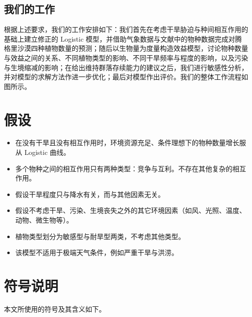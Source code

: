 \documentclass[11pt,a4paper]{ctexart}
\begin{document}
\subsection{我们的工作}

根据上述要求，我们的工作安排如下：我们首先在考虑干旱胁迫与种间相互作用的基础上建立修正的 Logistic 模型，并借助气象数据与文献中的物种数据完成对腾格里沙漠四种植物数量的预测；随后以生物量为度量构造效益模型，讨论物种数量与效益之间的关系、不同植物类型的影响、不同干旱频率与程度的影响，以及污染与生境缩减的影响；在给出维持群落存续能力的建议之后，我们进行敏感性分析，并对模型的求解方法作进一步优化；最后对模型作出评价。我们的整体工作流程如图所示。

\section{假设}

\begin{itemize}
\item 在没有干旱且没有相互作用时，环境资源充足、条件理想下的物种数量增长服从 Logistic 曲线。
\item 多个物种之间的相互作用只有两种类型：竞争与互利。不存在其他复杂的相互作用。
\item 假设干旱程度只与降水有关，而与其他因素无关。
\item 假设不考虑干旱、污染、生境丧失之外的其它环境因素（如风、光照、温度、动物、微生物等）。
\item 植物类型划分为敏感型与耐旱型两类，不考虑其他类型。
\item 该模型不适用于极端天气条件，例如严重干旱与洪涝。
\end{itemize}

\section{符号说明}

本文所使用的符号及其含义如下。
\end{document}
